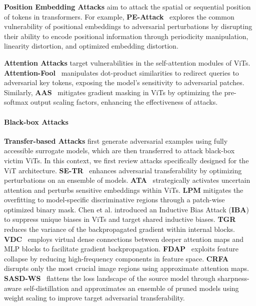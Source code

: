 \textbf{Position Embedding Attacks} aim to attack the spatial or sequential position of tokens in transformers. For example, \textbf{PE-Attack}~\cite{gao2024pe} explores the common vulnerability of positional embeddings to adversarial perturbations by disrupting their ability to encode positional information through periodicity manipulation, linearity distortion, and optimized embedding distortion.

\textbf{Attention Attacks} target vulnerabilities in the self-attention modules of ViTs. \textbf{Attention-Fool}~\cite{lovisotto2022give} manipulates dot-product similarities to redirect queries to adversarial key tokens, exposing the model's sensitivity to adversarial patches. Similarly, \textbf{AAS}~\cite{jain2024towards} mitigates gradient masking in ViTs by optimizing the pre-softmax output scaling factors, enhancing the effectiveness of attacks.


\paragraph{Black-box Attacks}
\textbf{Transfer-based Attacks} first generate adversarial examples using fully accessible surrogate models, which are then transferred to attack black-box victim ViTs. In this context, we first review attacks specifically designed for the ViT architecture.
\textbf{SE-TR}~\cite{naseer2021improving} enhances adversarial transferability by optimizing perturbations on an ensemble of models.
\textbf{ATA}~\cite{wang2022generating} strategically activates uncertain attention and perturbs sensitive embeddings within ViTs.
\textbf{LPM}\cite{wei2023boosting} mitigates the overfitting to model-specific discriminative regions through a patch-wise optimized binary mask.
Chen et al.\cite{chen2023understanding} introduced an Inductive Bias Attack (\textbf{IBA}) to suppress unique biases in ViTs and target shared inductive biases.
\textbf{TGR}~\cite{zhang2023transferable} reduces the variance of the backpropagated gradient within internal blocks.
\textbf{VDC}~\cite{zhang2024improving} employs virtual dense connections between deeper attention maps and MLP blocks to facilitate gradient backpropagation.
\textbf{FDAP}~\cite{gao2024attacking} exploits feature collapse by reducing high-frequency components in feature space.
\textbf{CRFA}~\cite{li2024improving} disrupts only the most crucial image regions using approximate attention maps.
\textbf{SASD-WS}~\cite{wu2024improving} flattens the loss landscape of the source model through sharpness-aware self-distillation and approximates an ensemble of pruned models using weight scaling to improve target adversarial transferability.

